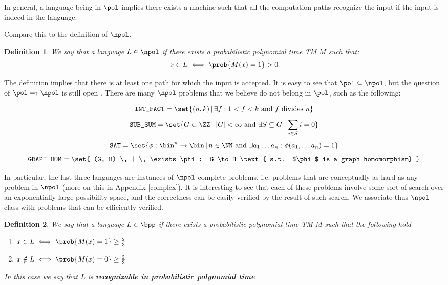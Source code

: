 \documentclass{article}
\newtheorem{definition}{Definition}
\begin{document}
In general, a language being in $\pol$ implies there exists a machine such that all the computation paths recognize the input if the input is indeed in the language. \par

Compare this to the definition of $\npol$.

\begin{definition}
    We say that a language $L \in \npol$ if there exists a probabilistic polynomial time TM $M$ such that:
    \[x \in L \iff \prob{M(x) = 1} > 0\]
\end{definition}

The definition implies that there is at least one path for which the input is accepted. It is easy to see that $\pol \subseteq \npol$, but the question of $\pol =_? \npol$ is still open \cite{cookComplexityTheoremprovingProcedures1971} \cite{jaffeMillenniumGrandChallenge2006}. There are many $\npol$ problems that we believe do not belong in $\pol$, such as the following:

\[ \texttt{INT\_FACT} = \set{ (n, k) \, | \, \exists f : 1 < f < k \text { and } f \text{ divides } n}\]
\[ \texttt{SUB\_SUM} = \set{ G \subset \ZZ \, | \, \, |G| < \infty \text{ and } \exists S \subseteq G : \sum_{i \in S} i = 0  } \]
\[ \texttt{SAT} = \set{ \phi : \bin^n \to \bin \, | \, n \in \NN \text{ and } \exists a_1 \dots a_n : \phi(a_1, \dots a_n) = 1 } \]
\[ \texttt{GRAPH\_HOM} = \set{ (G, H) \, | \, \exists \phi : G \to H \text{ s.t. $\phi$ is a graph homomorphism} }\]

In particular, the last three languages are instances of $\npol$-complete problems, i.e. problems that are conceptually as hard as any problem in $\npol$ (more on this in Appendix \ref{complex}). It is interesting to see that each of these problems involve some sort of search over an exponentially large possibility space, and the correctness can be easily verified by the result of such search. We associate thus $\npol$ class with problems that can be efficiently verified.

\begin{definition}
    We say that a language $L \in \bpp$ if there exists a probabilistic polynomial time TM $M$ such that the following hold
    \begin{enumerate}
        \item $x \in L \iff \prob{M(x) = 1} \geq \frac{2}{3}$
        \item $x \notin L \iff \prob{M(x) = 0} \geq \frac{2}{3}$
    \end{enumerate}
    In this case we say that $L$ is \textbf{recognizable in probabilistic polynomial time}
\end{definition}
\end{document}
